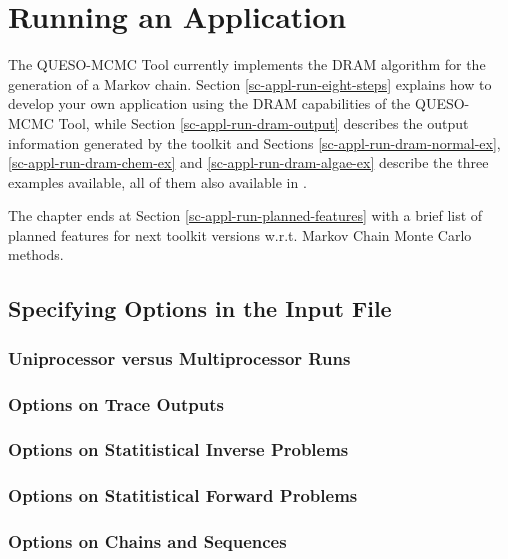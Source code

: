 \chapter{Running an Application}\label{ch-appl-run}
\thispagestyle{headings}

The QUESO-MCMC Tool currently implements the DRAM algorithm \cite{HaLaMiSa06} for the generation of a Markov chain.
Section \ref{sc-appl-run-eight-steps} explains how to develop your own application using the DRAM capabilities of the QUESO-MCMC Tool, while
Section \ref{sc-appl-run-dram-output} describes the output information generated by the toolkit and
Sections
\ref{sc-appl-run-dram-normal-ex},
\ref{sc-appl-run-dram-chem-ex} and
\ref{sc-appl-run-dram-algae-ex}
describe the three examples available,
all of them also available in \cite{mcmctool}.

The chapter ends at Section \ref{sc-appl-run-planned-features} with a brief list of planned features for next toolkit versions w.r.t. Markov Chain Monte Carlo methods.

\section{Specifying Options in the Input File}

\subsection{Uniprocessor versus Multiprocessor Runs}

\subsection{Options on Trace Outputs}

\subsection{Options on Statitistical Inverse Problems}

\subsection{Options on Statitistical Forward Problems}

\subsection{Options on Chains and Sequences}

